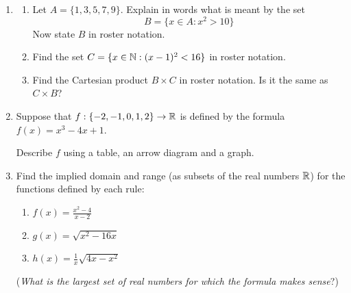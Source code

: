 \begin{exercises}{}{}
\begin{enumerate}
	  
	  \item\begin{enumerate}
	    \item Let $A=\{1,3,5,7,9\}$. Explain in words what is meant by the set
	    \[
	    	B=\{x\in A:x^2>10\}
	    \]
	    Now state $B$ in roster notation.
	    
	    \item Find the set $C=\{x\in\mathbb{N}:(x-1)^2<16\}$ in roster notation.
	    
	    \item Find the Cartesian product $B\times C$ in roster notation. Is it the same as $C\times B$?
	  \end{enumerate}
	  
	  
	  \item Suppose that $f:\{-2,-1,0,1,2\}\to\mathbb{R}$ is defined by the formula $f(x)=x^3-4x+1$.\par
	  Describe $f$ using a table, an arrow diagram and a graph.
	  
	  
	  \item Find the implied domain and range (as subsets of the real numbers $\mathbb{R}$) for the functions defined by each rule:
	  \begin{enumerate}
	    \item $f(x)=\frac{x^2-4}{x-2}$
	    
	    \item $g(x)=\sqrt{x^2-16x}$
	    
	    \item $h(x)=\frac 1x\sqrt{4x-x^2}$
	  \end{enumerate}
	  (\emph{What is the largest set of real numbers for which the formula makes sense}?)
	  
	  
	  \pagebreak[3]
	  
	  
	  

\end{enumerate}
\end{exercises}
